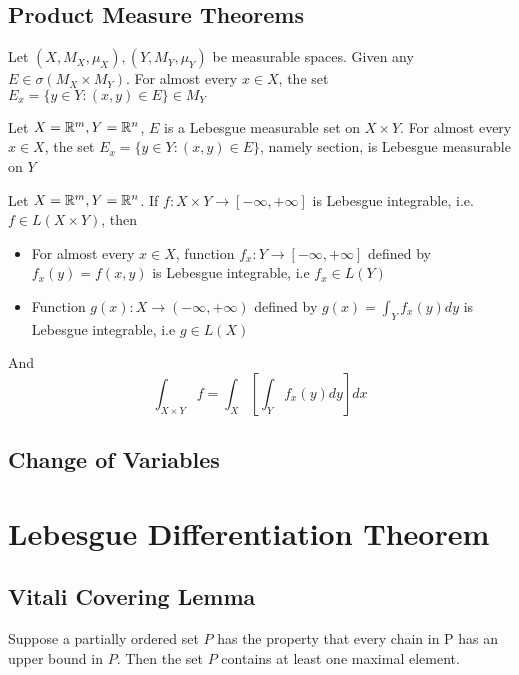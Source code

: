 \documentclass{report}
\begin{document}
\section{Product Measure Theorems}
\begin{proposition}
    Let $(X, M_X, \mu_X), (Y, M_Y, \mu_Y)$ be measurable spaces. Given any $E \in \sigma(M_X \times M_Y)$. For almost every $x \in X$, the set $E_x = \{y \in Y: (x, y) \in E \} \in M_Y$
\end{proposition}

\begin{proposition}
    Let $X = \mathbb{R}^m, Y = \mathbb{R}^n$, $E$ is a Lebesgue measurable set on $X \times Y$. For almost every $x \in X$, the set $E_x = \{y \in Y: (x, y) \in E \}$, namely section, is Lebesgue measurable on $Y$
\end{proposition}
    
\begin{theorem}
    Let $X = \mathbb{R}^m, Y = \mathbb{R}^n$. If $f: X \times Y \to [-\infty, +\infty]$ is Lebesgue integrable, i.e. $f \in L(X \times Y)$, then
    \begin{itemize}
        \item For almost every $x \in X$, function $f_x: Y \to [-\infty, +\infty]$ defined by $f_x(y) = f(x, y)$ is Lebesgue integrable, i.e $f_x \in L(Y)$
        \item Function $g(x): X \to (-\infty, +\infty)$ defined by $g(x) = \int_{Y} f_x(y) dy$ is Lebesgue integrable, i.e $g \in L(X)$
    \end{itemize}
    And
    \[
        \int_{X \times Y} f = \int_X \left[ \int_Y f_x(y) dy \right] dx
    \]
\end{theorem}

\section{Change of Variables}

\chapter{Lebesgue Differentiation Theorem}
\section{Vitali Covering Lemma}

\begin{lemma}
    Suppose a partially ordered set $P$ has the property that every chain in P has an upper bound in $P$. Then the set $P$ contains at least one maximal element. 
\end{lemma}
\end{document}
